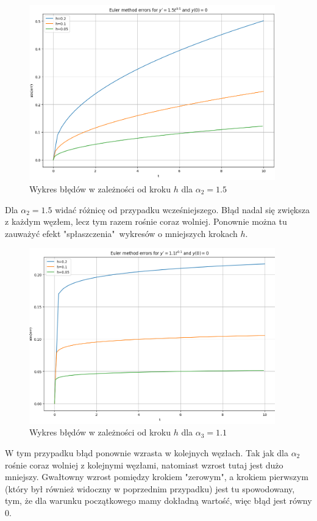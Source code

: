 \documentclass{article}
\begin{document}
\begin{figure}[H]
    \centering
    \includegraphics[width=0.95\textwidth]{2}
    \caption{Wykres błędów w zależności od kroku $h$ dla $\alpha_2 = 1.5$}
    \label{fig:mesh}
\end{figure}
Dla $\alpha_2 = 1.5$ widać różnicę od przypadku wcześniejszego. Błąd nadal się zwiększa z każdym węzłem, lecz tym razem rośnie coraz wolniej. Ponownie można tu zauważyć efekt "spłaszczenia"\ wykresów o mniejszych krokach $h$.
\begin{figure}[H]
    \centering
    \includegraphics[width=0.95\textwidth]{3}
    \caption{Wykres błędów w zależności od kroku $h$ dla $\alpha_3 = 1.1$}
    \label{fig:mesh}
\end{figure}
W tym przypadku błąd ponownie wzrasta w kolejnych węzłach. Tak jak dla $\alpha_2$ rośnie coraz wolniej z kolejnymi węzłami, natomiast wzrost tutaj jest dużo mniejszy. Gwałtowny wzrost pomiędzy krokiem "zerowym", a krokiem pierwszym (który był również widoczny w poprzednim przypadku) jest tu spowodowany, tym, że dla warunku początkowego mamy dokładną wartość, więc błąd jest równy 0.
\end{document}
